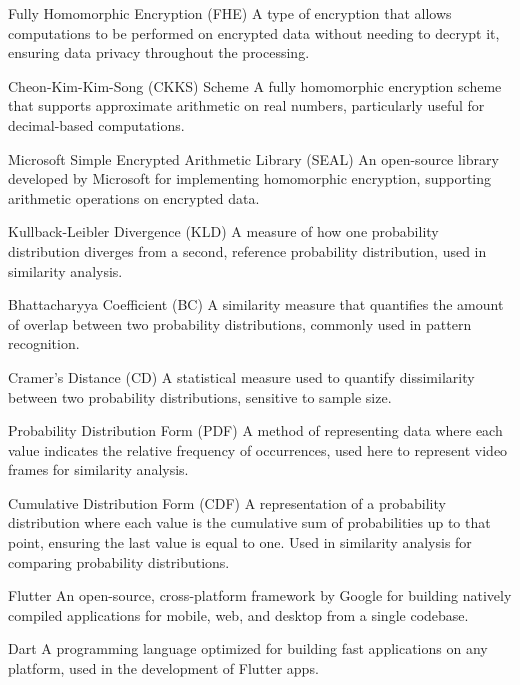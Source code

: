 \begin{glossary}
\item[Fully Homomorphic Encryption (FHE)] A type of encryption that allows computations to be performed on encrypted data without needing to decrypt it, ensuring data privacy throughout the processing.

\item[Cheon-Kim-Kim-Song (CKKS) Scheme] A fully homomorphic encryption scheme that supports approximate arithmetic on real numbers, particularly useful for decimal-based computations.

\item[Microsoft Simple Encrypted Arithmetic Library (SEAL)] An open-source library developed by Microsoft for implementing homomorphic encryption, supporting arithmetic operations on encrypted data.

\item[Kullback-Leibler Divergence (KLD)] A measure of how one probability distribution diverges from a second, reference probability distribution, used in similarity analysis.

\item[Bhattacharyya Coefficient (BC)] A similarity measure that quantifies the amount of overlap between two probability distributions, commonly used in pattern recognition.

\item[Cramer's Distance (CD)] A statistical measure used to quantify dissimilarity between two probability distributions, sensitive to sample size.

\item[Probability Distribution Form (PDF)] A method of representing data where each value indicates the relative frequency of occurrences, used here to represent video frames for similarity analysis.

\item[Cumulative Distribution Form (CDF)] A representation of a probability distribution where each value is the cumulative sum of probabilities up to that point, ensuring the last value is equal to one. Used in similarity analysis for comparing probability distributions.

\item[Flutter] An open-source, cross-platform framework by Google for building natively compiled applications for mobile, web, and desktop from a single codebase.

\item[Dart] A programming language optimized for building fast applications on any platform, used in the development of Flutter apps.


\end{glossary}
